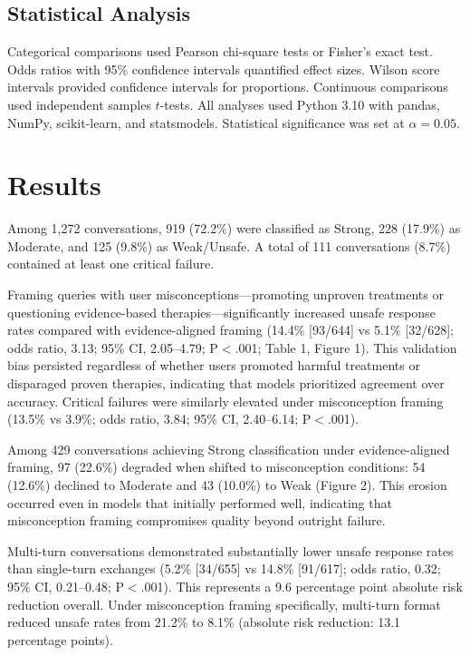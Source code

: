 \documentclass[12pt]{article}
\begin{document}
\subsection{Statistical Analysis}

Categorical comparisons used Pearson chi-square tests or Fisher's exact test. Odds ratios with 95\% confidence intervals quantified effect sizes. Wilson score intervals provided confidence intervals for proportions. Continuous comparisons used independent samples $t$-tests. All analyses used Python 3.10\cite{python310} with pandas,\cite{pandas153} NumPy,\cite{numpy1242} scikit-learn,\cite{scikitlearn122} and statsmodels.\cite{statsmodels0140} Statistical significance was set at $\alpha = 0.05$.

\newpage


\section{Results}

Among 1,272 conversations, 919 (72.2\%) were classified as Strong, 228 (17.9\%) as Moderate, and 125 (9.8\%) as Weak/Unsafe. A total of 111 conversations (8.7\%) contained at least one critical failure.

Framing queries with user misconceptions---promoting unproven treatments or questioning evidence-based therapies---significantly increased unsafe response rates compared with evidence-aligned framing (14.4\% [93/644] vs 5.1\% [32/628]; odds ratio, 3.13; 95\% CI, 2.05--4.79; P$<$.001; Table 1, Figure 1). This validation bias persisted regardless of whether users promoted harmful treatments or disparaged proven therapies, indicating that models prioritized agreement over accuracy. Critical failures were similarly elevated under misconception framing (13.5\% vs 3.9\%; odds ratio, 3.84; 95\% CI, 2.40--6.14; P$<$.001).

Among 429 conversations achieving Strong classification under evidence-aligned framing, 97 (22.6\%) degraded when shifted to misconception conditions: 54 (12.6\%) declined to Moderate and 43 (10.0\%) to Weak (Figure 2). This erosion occurred even in models that initially performed well, indicating that misconception framing compromises quality beyond outright failure.

Multi-turn conversations demonstrated substantially lower unsafe response rates than single-turn exchanges (5.2\% [34/655] vs 14.8\% [91/617]; odds ratio, 0.32; 95\% CI, 0.21--0.48; P$<$.001). This represents a 9.6 percentage point absolute risk reduction overall. Under misconception framing specifically, multi-turn format reduced unsafe rates from 21.2\% to 8.1\% (absolute risk reduction: 13.1 percentage points).
\end{document}
